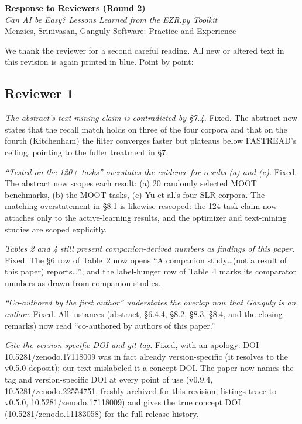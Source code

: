 \documentclass[11pt]{article}
\begin{document}
\begin{center}
{\Large\bf Response to Reviewers (Round 2)}\\[4pt]
{\it Can AI be Easy? Lessons Learned from the EZR.py Toolkit}\\[2pt]
Menzies, Srinivasan, Ganguly \hfill Software: Practice and Experience
\end{center}
\medskip


We thank the reviewer for a second careful reading. All new or
altered text in this revision is again printed in blue. Point by
point:

\subsection*{Reviewer 1}

\smallskip{} {\em The abstract's text-mining claim is
contradicted by \S7.4.} Fixed. The abstract now states that the
recall match holds on three of the four corpora and that on the
fourth (Kitchenham) the filter converges faster but plateaus
below FASTREAD's ceiling, pointing to the fuller treatment in
\S7.

\smallskip{} {\em ``Tested on the 120+ tasks'' overstates
the evidence for results (a) and (c).} Fixed. The abstract now
scopes each result: (a) 20 randomly selected MOOT benchmarks,
(b) the MOOT tasks, (c) Yu et al.'s four SLR corpora. The
matching overstatement in \S8.1 is likewise rescoped: the
124-task claim now attaches only to the active-learning results,
and the optimizer and text-mining studies are scoped explicitly.

\smallskip{} {\em Tables 2 and 4 still present
companion-derived numbers as findings of this paper.} Fixed. The
\S6 row of Table~2 now opens ``A companion
study\ldots (not a result of this paper) reports\ldots'', and the
label-hunger row of Table~4 marks its comparator
numbers as drawn from companion studies.

\smallskip{} {\em ``Co-authored by the first author''
understates the overlap now that Ganguly is an author.} Fixed.
All instances (abstract, \S6.4.4, \S8.2, \S8.3, \S8.4, and
the closing remarks) now read ``co-authored by authors of this
paper.''

\smallskip{} {\em Cite the version-specific DOI and git
tag.} Fixed, with an apology: DOI
\textsf{10.5281/zenodo.17118009} was in fact already
version-specific (it resolves to the \textsf{v0.5.0} deposit);
our text mislabeled it a concept DOI. The paper now names the
tag and version-specific DOI at every point of use
(\textsf{v0.9.4}, \textsf{10.5281/zenodo.22554751}, freshly
archived for this revision; listings trace to \textsf{v0.5.0},
\textsf{10.5281/zenodo.17118009}) and gives the true concept
DOI (\textsf{10.5281/zenodo.11183058}) for the full release
history.
\end{document}
